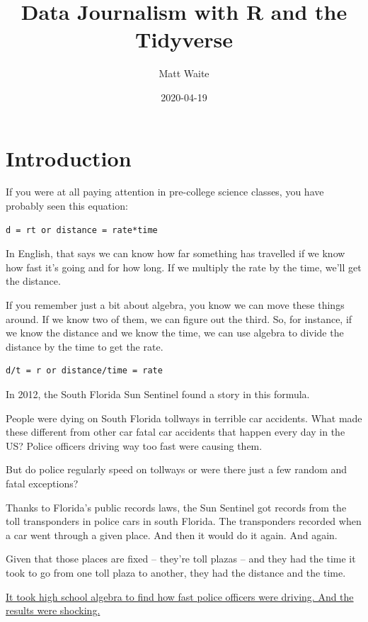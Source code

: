 \documentclass[]{book}
\title{Data Journalism with R and the Tidyverse}
\author{Matt Waite}
\date{2020-04-19}
\begin{document}
\maketitle

{
\setcounter{tocdepth}{1}
\tableofcontents
}
\hypertarget{introduction}{%
\chapter{Introduction}\label{introduction}}

If you were at all paying attention in pre-college science classes, you have probably seen this equation:

\begin{verbatim}
d = rt or distance = rate*time
\end{verbatim}

In English, that says we can know how far something has travelled if we know how fast it's going and for how long. If we multiply the rate by the time, we'll get the distance.

If you remember just a bit about algebra, you know we can move these things around. If we know two of them, we can figure out the third. So, for instance, if we know the distance and we know the time, we can use algebra to divide the distance by the time to get the rate.

\begin{verbatim}
d/t = r or distance/time = rate
\end{verbatim}

In 2012, the South Florida Sun Sentinel found a story in this formula.

People were dying on South Florida tollways in terrible car accidents. What made these different from other car fatal car accidents that happen every day in the US? Police officers driving way too fast were causing them.

But do police regularly speed on tollways or were there just a few random and fatal exceptions?

Thanks to Florida's public records laws, the Sun Sentinel got records from the toll transponders in police cars in south Florida. The transponders recorded when a car went through a given place. And then it would do it again. And again.

Given that those places are fixed -- they're toll plazas -- and they had the time it took to go from one toll plaza to another, they had the distance and the time.

\href{http://www.sun-sentinel.com/news/local/speeding-cops/fl-speeding-cops-20120211,0,3706919.story}{It took high school algebra to find how fast police officers were driving. And the results were shocking.}
\end{document}

